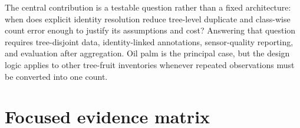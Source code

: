 The central contribution is a testable question rather than a fixed architecture: when does explicit identity resolution reduce tree-level duplicate and class-wise count error enough to justify its assumptions and cost? Answering that question requires tree-disjoint data, identity-linked annotations, sensor-quality reporting, and evaluation after aggregation. Oil palm is the principal case, but the design logic applies to other tree-fruit inventories whenever repeated observations must be converted into one count.

\appendix

\section{Focused evidence matrix}
\label{app:matrix2}

